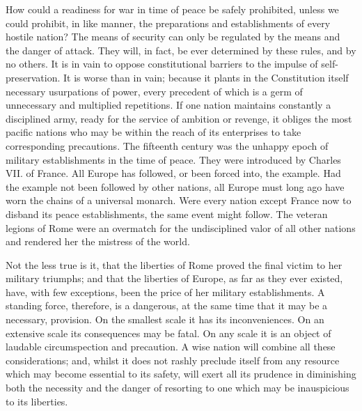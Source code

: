 How could a readiness for war in time of peace be safely prohibited, unless we could prohibit, in like manner, the preparations and establishments of every hostile nation? The means of security can only be regulated by the means and the danger of attack. They will, in fact, be ever determined by these rules, and by no others. It is in vain to oppose constitutional barriers to the impulse of self-preservation. It is worse than in vain; because it plants in the Constitution itself necessary usurpations of power, every precedent of which is a germ of unnecessary and multiplied repetitions. If one nation maintains constantly a disciplined army, ready for the service of ambition or revenge, it obliges the most pacific nations who may be within the reach of its enterprises to take corresponding precautions. The fifteenth century was the unhappy epoch of military establishments in the time of peace. They were introduced by Charles VII. of France. All Europe has followed, or been forced into, the example. Had the example not been followed by other nations, all Europe must long ago have worn the chains of a universal monarch. Were every nation except France now to disband its peace establishments, the same event might follow. The veteran legions of Rome were an overmatch for the undisciplined valor of all other nations and rendered her the mistress of the world.

Not the less true is it, that the liberties of Rome proved the final victim to her military triumphs; and that the liberties of Europe, as far as they ever existed, have, with few exceptions, been the price of her military establishments. A standing force, therefore, is a dangerous, at the same time that it may be a necessary, provision. On the smallest scale it has its inconveniences. On an extensive scale its consequences may be fatal. On any scale it is an object of laudable circumspection and precaution. A wise nation will combine all these considerations; and, whilst it does not rashly preclude itself from any resource which may become essential to its safety, will exert all its prudence in diminishing both the necessity and the danger of resorting to one which may be inauspicious to its liberties.

